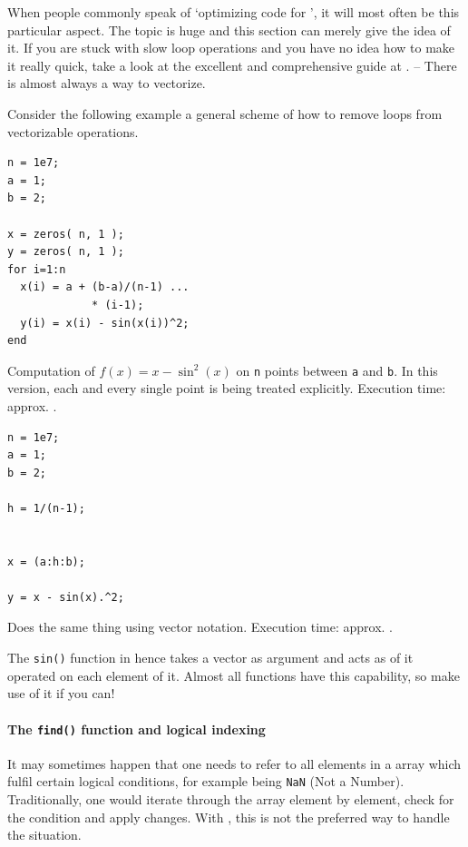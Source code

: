 When people commonly speak of `optimizing code for \matlab{}', it will most often be this particular aspect. The topic is huge and this section can merely give the idea of it. If you are stuck with slow loop operations and you have no idea how to make it really quick, take a look at the excellent and comprehensive guide at \cite{Mathworks:2009:CVG}. -- There is almost always a way to vectorize.

Consider the following example a general scheme of how to remove loops from vectorizable operations.

\hfill
\begin{minipage}[t]{.45\textwidth}
\begin{lstlisting}[framerule=2pt,rulecolor=\color{badred}]
n = 1e7;
a = 1;
b = 2;

x = zeros( n, 1 );
y = zeros( n, 1 );
for i=1:n
  x(i) = a + (b-a)/(n-1) ...
             * (i-1);
  y(i) = x(i) - sin(x(i))^2;
end
\end{lstlisting}
Computation of $f(x)=x-\sin^2(x)$ on \lstinline!n! points between \lstinline!a! and \lstinline!b!. In this version, each and every single point is being treated explicitly. Execution time: approx. .
\end{minipage}
\hfill
\begin{minipage}[t]{.45\textwidth}
\begin{lstlisting}[framerule=2pt,rulecolor=\color{goodgreen}]
n = 1e7;
a = 1;
b = 2;

h = 1/(n-1);


x = (a:h:b);

y = x - sin(x).^2;

\end{lstlisting}
Does the same thing using vector notation. Execution time: approx. .
\end{minipage}
\hfill

The \lstinline!sin()! function in \matlab{} hence takes a vector as argument and acts as of it operated on each element of it. Almost all \matlab{} functions have this capability, so make use of it if you can!


\paragraph{The \lstinline!find()! function and logical indexing}

It may sometimes happen that one needs to refer to all elements in a \matlab{} array which fulfil certain logical conditions, for example being \lstinline!NaN! (Not a Number). Traditionally, one would iterate through the array element by element, check for the condition and apply changes. With \matlab{}, this is not the preferred way to handle the situation.

